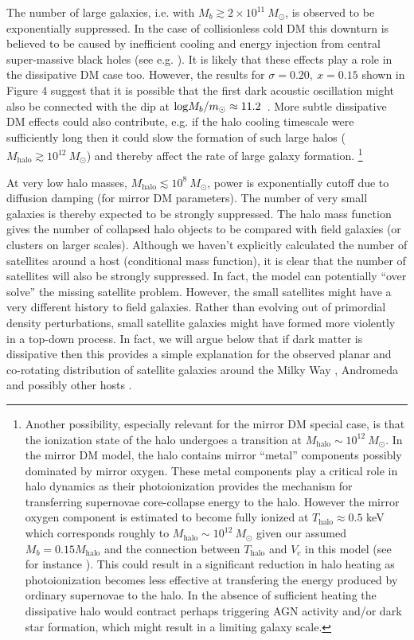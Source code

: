 \documentclass[12pt]{article}
\begin{document}
The number of large galaxies, i.e. with $M_b \gtrsim 2 \times 10^{11} \ M_\odot$, is observed to be exponentially suppressed. In the case of
collisionless cold DM this downturn is believed to be caused by inefficient cooling and energy injection 
from central super-massive black holes (see
e.g. \cite{croton}). It is likely that these effects play a role in the dissipative DM case too. 
However, the results for $\sigma = 0.20, \ x=0.15$
shown in Figure 4
suggest that it is possible that the first dark acoustic 
oscillation might also be connected with the dip at ${\rm log} M_b/m_{\odot} \approx 11.2$\ .
More subtle dissipative DM effects could also contribute, e.g. if
the halo cooling timescale were sufficiently long then it could slow the formation of such large halos ($M_{\text{halo}} \gtrsim 10^{12} \ M_\odot$)
and thereby affect the rate of large galaxy formation.
\footnote{Another possibility, especially relevant for the mirror DM special case, is that the ionization state of the 
halo undergoes a transition at $M_{\text{halo}} \sim 10^{12} \ M_\odot$. In the mirror DM model, the 
halo contains mirror ``metal''  components possibly dominated by mirror oxygen. These metal components play a critical role in halo
dynamics as their photoionization provides the mechanism for transferring supernovae core-collapse energy to the halo.
However the mirror oxygen component is estimated to become fully ionized 
at $T_{\text{halo}} \approx 0.5$ keV which corresponds roughly to $M_{\text{halo}} \sim 10^{12} \ M_\odot$ given our 
assumed $M_b = 0.15M_{\text{halo}}$ and the connection between $T_{\text{halo}}$ and $V_{c}$ in this model (see for instance \cite{m1}). 
This could result in a significant reduction in halo heating as photoionization becomes less effective at transfering 
the energy produced by ordinary supernovae to the halo. In the absence of sufficient heating the dissipative 
halo would  contract perhaps triggering AGN activity and/or dark star formation, which might result in a limiting galaxy scale.}


At very low halo masses, $M_{\text{halo}} \lesssim 10^{8} \ M_\odot$, power is exponentially cutoff due to 
diffusion damping (for mirror DM parameters). The number of very small galaxies is thereby expected to be strongly suppressed. The halo mass 
function gives the number of collapsed  
halo objects to be compared with field galaxies (or clusters on larger scales). Although 
we haven't explicitly calculated the number of satellites around a host (conditional mass function), it is clear that the 
number of satellites will also be strongly suppressed. In fact, the model can potentially ``over solve'' the 
missing satellite problem. However, the small satellites might have a very different history to field galaxies. Rather than evolving out 
of primordial density perturbations, small satellite galaxies might have formed more violently in a top-down process.  
%
In fact, we will argue below that if dark matter is dissipative then this provides a simple explanation 
for the observed planar and co-rotating distribution of satellite galaxies around
the Milky Way \cite{paw}, Andromeda \cite{ibata} and possibly other hosts \cite{lewis}.
\end{document}
